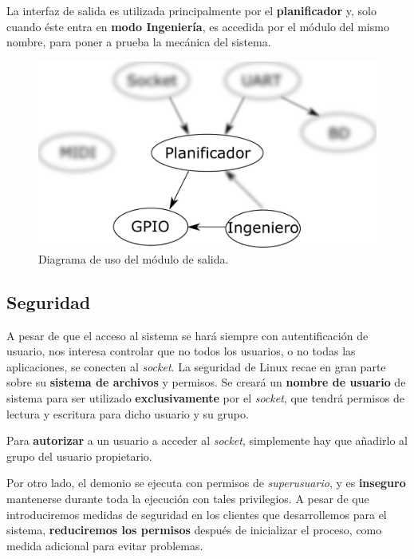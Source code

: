 La interfaz de salida es utilizada principalmente por el \textbf{planificador} y, solo cuando éste entra en \textbf{modo Ingeniería}, es accedida por el módulo del mismo nombre, para poner a prueba la mecánica del sistema.

\smallskip

\begin{figure}[H]
	\noindent \begin{centering}
		\includegraphics[width=\linewidth/2]{capitulo4/daemon_gpio}
		\par\end{centering}
	\smallskip
	\caption{\label{fig:daemon_gpio} Diagrama de uso del módulo de salida.}
\end{figure} 

\smallskip

\subsection{Seguridad}

A pesar de que el acceso al sistema se hará siempre con autentificación de usuario, nos interesa controlar que no todos los usuarios, o no todas las aplicaciones, se conecten al \textit{socket}. La seguridad de Linux recae en gran parte sobre su \textbf{sistema de archivos} y permisos. Se creará un \textbf{nombre de usuario} de sistema para ser utilizado \textbf{exclusivamente} por el \textit{socket}, que tendrá permisos de lectura y escritura para dicho usuario y su grupo.

Para \textbf{autorizar} a un usuario a acceder al \textit{socket}, simplemente hay que añadirlo al grupo del usuario propietario.

Por otro lado, el demonio se ejecuta con permisos de \textit{superusuario}, y es \textbf{inseguro} mantenerse durante toda la ejecución con tales privilegios. A pesar de que introduciremos medidas de seguridad en los clientes que desarrollemos para el sistema, \textbf{reduciremos los permisos} después de inicializar el proceso, como medida adicional para evitar problemas.

